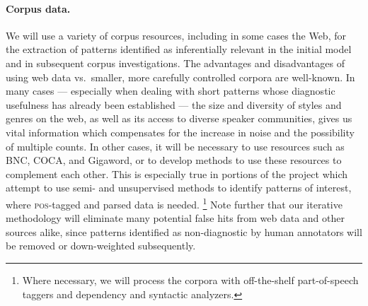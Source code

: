 \documentclass[10pt]{article}
\begin{document}


\vspace {-4mm}

\paragraph{Corpus data.}
We will use a variety of corpus resources, including in some cases the Web, for the extraction of patterns identified as inferentially relevant in the initial model and in subsequent corpus investigations. 
The advantages and disadvantages of using web data vs.\ smaller, more carefully controlled corpora are well-known.
In many cases --- especially when dealing with short patterns whose diagnostic usefulness has already been established --- the size and diversity of styles and genres on the web, as well as its access to diverse speaker communities, gives us vital information which compensates for the increase in noise and the possibility of multiple counts.
In other cases, it will be necessary to use resources such as BNC, COCA, and Gigaword, or to develop methods to use these resources to complement each other.
This is especially true in portions of the project which attempt to use semi- and unsupervised methods to identify patterns of interest, where \textsc{pos}-tagged and parsed data is needed.
\footnote{Where necessary, we will process the corpora with off-the-shelf part-of-speech taggers and dependency and syntactic analyzers.}
Note further that  our iterative methodology will eliminate many potential false hits from web data and other sources alike, since patterns  identified as non-diagnostic by human annotators will be removed or down-weighted subsequently.
\end{document}
